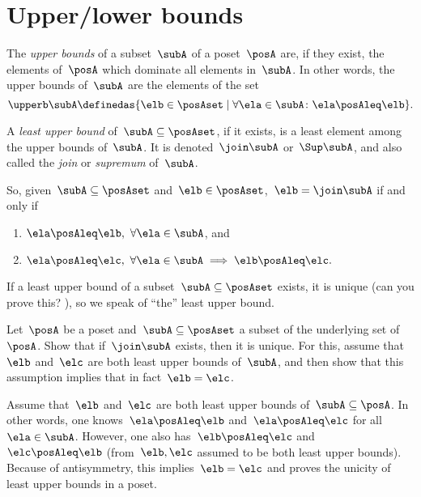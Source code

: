 \section{Upper/lower bounds}
\begin{ctdefinition}
    \label{def:least-upper-bound}
    The \emph{upper bounds} of a subset~$\subA$ of a poset~$\posA$ are, if they exist, the elements of~$\posA$ which dominate all elements in~$\subA$.
    In other words, the upper bounds of~$\subA$ are the elements of the set
    \begin{equation*}
        \upperb \subA\definedas \{ \elb \in \posAset \mid \forall \ela \in \subA  \colon \ela \posAleq \elb \}.
    \end{equation*}
\end{ctdefinition}

\begin{ctdefinition}
    A \emph{least upper bound} of~$\subA \subseteq \posAset$, if it exists, is a least element among the upper bounds of~$\subA$.
    It is denoted~$\join \subA$ or~$\Sup\subA$, and also called the \emph{join} or \emph{supremum} of~$\subA$.
\end{ctdefinition}

So, given~$\subA \subseteq \posAset$ and~$\elb \in \posAset$,~$\elb =  \join \subA$ if and only if
\begin{enumerate}
    \item $\ela \posAleq \elb, \ \forall \ela \in \subA$, and
    \item $\ela \posAleq \elc, \ \forall \ela \in \subA \implies \elb \posAleq \elc.
          $
\end{enumerate}

If a least upper bound of a subset~$\subA \subseteq \posAset$ exists, it is unique (can you prove this?
), so we speak of ``the'' least upper bound.

\begin{exercise}
    Let~$\posA$ be a poset and~$\subA \subseteq \posAset$ a subset of the underlying set of~$\posA$.
    Show that if~$\join \subA$ exists, then it is unique.
    For this, assume that~$\elb$ and~$\elc$ are both least upper bounds of~$\subA$, and then show that this assumption implies that in fact~$\elb = \elc$.
\end{exercise}
\begin{solution}
    Assume that~$\elb$ and~$\elc$ are both least upper bounds of~$\subA \subseteq \posA$.
    In other words, one knows~$\ela \posAleq \elb$ and~$\ela\posAleq \elc$ for all~$\ela\in \subA$.
    However, one also has~$\elb\posAleq \elc$ and~$\elc\posAleq \elb$ (from~$\elb,\elc$ assumed to be both least upper bounds).
    Because of antisymmetry, this implies~$\elb=\elc$ and proves the unicity of least upper bounds in a poset.
\end{solution}


